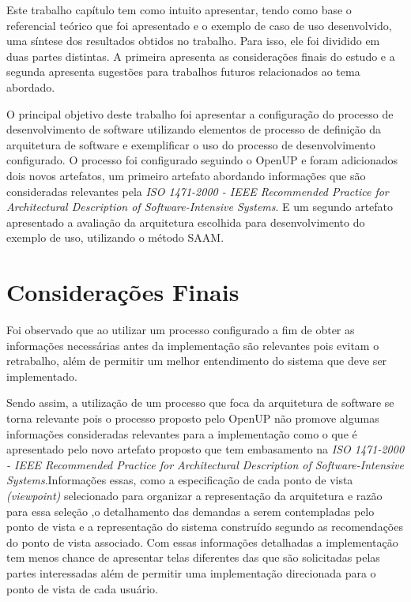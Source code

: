 Este trabalho capítulo tem como intuito apresentar, tendo como base o referencial teórico que foi apresentado e o exemplo de caso de uso desenvolvido, uma síntese dos resultados obtidos no trabalho. Para isso, ele foi dividido em duas partes distintas. A primeira apresenta as considerações finais do estudo e a segunda apresenta sugestões para trabalhos futuros relacionados ao tema abordado.

O principal objetivo deste trabalho foi apresentar a configuração do processo de desenvolvimento de software utilizando elementos de processo de definição da arquitetura de software e exemplificar o uso do processo de desenvolvimento configurado. O processo foi configurado seguindo o \acrfull{OpenUP} e foram adicionados dois novos artefatos, um primeiro artefato abordando informações que são consideradas relevantes pela \emph{ISO 1471-2000 - IEEE Recommended Practice for Architectural Description of Software-Intensive Systems}. E um segundo artefato apresentado a avaliação da arquitetura escolhida para desenvolvimento do exemplo de uso, utilizando o método \acrfull{SAAM}.
 
\section{Considerações Finais}
Foi observado que ao utilizar um processo configurado a fim de obter as informações necessárias antes da implementação são relevantes pois evitam o retrabalho, além de permitir um melhor entendimento do sistema que deve ser implementado.

Sendo assim, a utilização de um processo que foca da arquitetura de software se torna relevante pois o processo proposto pelo \acrfull{OpenUP} não promove algumas informações consideradas relevantes para a implementação como o que é apresentado pelo novo artefato proposto que tem embasamento na \emph{ISO 1471-2000 - IEEE Recommended Practice for Architectural Description of Software-Intensive Systems}.Informações essas, como a especificação de cada ponto de vista \emph{(viewpoint)} selecionado para organizar a representação da arquitetura e razão para essa seleção ,o detalhamento das demandas a serem contempladas pelo ponto de vista e a representação do sistema construído segundo as recomendações do ponto de vista
associado. Com essas informações detalhadas a implementação tem menos chance de apresentar telas diferentes das que são solicitadas pelas partes interessadas além de permitir uma implementação direcionada para o ponto de vista de cada usuário.

